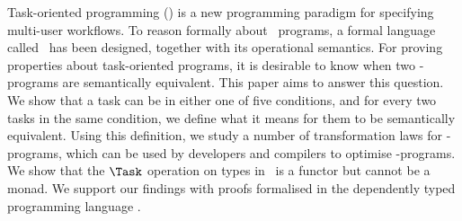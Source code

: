 Task-oriented programming (\TOP) is a new programming paradigm for specifying multi-user workflows.
To reason formally about \TOP\ programs, a formal language called \TOPHAT\ has been designed, together with its operational semantics.
For proving properties about task-oriented programs, it is desirable to know when two \TOPHAT-programs are semantically equivalent.
This paper aims to answer this question.
We show that a task can be in either one of five conditions,
and for every two tasks in the same condition, we define what it means for them to be semantically equivalent.
Using this definition, we study a number of transformation laws for \TOPHAT-programs,
which can be used by developers and compilers to optimise \TOP-programs.
We show that the $\Task$ operation on types in \TOPHAT\ is a functor but cannot be a monad.
We support our findings with proofs formalised in the dependently typed programming language \IDRIS.

